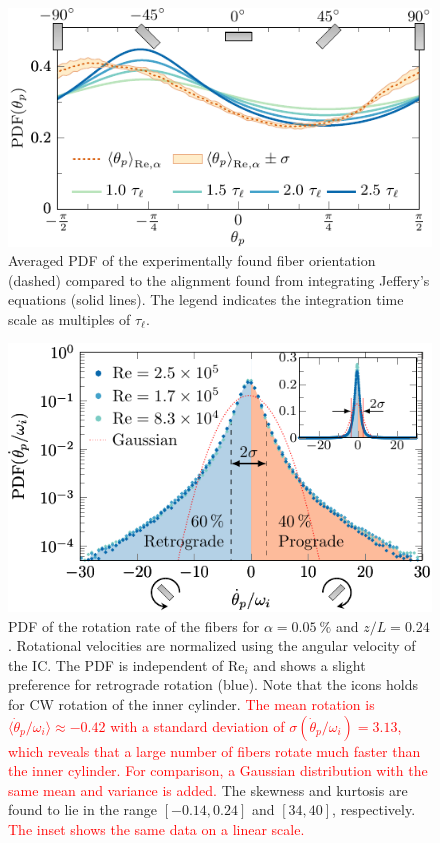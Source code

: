 \documentclass[aps, pre, onecolumn, superscriptaddress,longbibliography]{revtex4-1}
\newcommand{\makered}[1]{\textcolor{red}{#1}}
\begin{document}
\begin{figure}[htp]
\centering
\includegraphics[scale=1.2]{figure10Jeffery}
\caption{Averaged PDF of the experimentally found fiber orientation (dashed)
compared to the alignment found from integrating Jeffery's equations (solid
lines). The legend indicates the integration time scale as multiples of
$\tau_\ell$.}
\label{fig:fiberjeffery}
\end{figure}%
%
\begin{figure}[htp]
\centering
\includegraphics[scale=1.2]{figure6bfiberrrate}
\caption{PDF of the rotation rate of the fibers for
$\alpha=\SI{0.05}{\percent}$ and $z/L=0.24$. Rotational velocities are
normalized using the angular velocity of the IC. The PDF is
independent of $\text{Re}_i$ and shows a slight preference for retrograde
rotation (blue). Note that the icons holds for CW rotation of the inner
cylinder.
\makered{The mean rotation is $\langle \dot{\theta}_p/\omega_i \rangle \approx -0.42$ with a standard deviation of 
$\sigma(\dot{\theta}_p/\omega_i)=3.13$, which reveals that a large number of 
fibers rotate much faster than the inner cylinder. For comparison, a Gaussian distribution with the same mean and variance is added.}
The skewness and kurtosis are found to lie in
the range $[-0.14, 0.24]$ and $[34,40]$, respectively.
\makered{The inset shows the same data on a linear scale.}%
}%
\label{fig:fiberrotation}%
\end{figure}%
\end{document}
